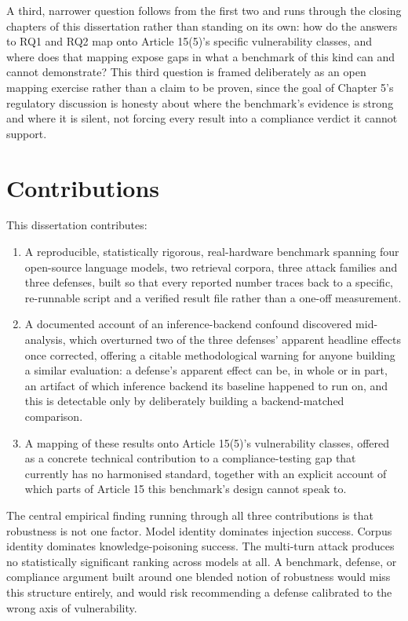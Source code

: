 A third, narrower question follows from the first two and runs through
the closing chapters of this dissertation rather than standing on its
own: how do the answers to RQ1 and RQ2 map onto Article 15(5)'s specific
vulnerability classes, and where does that mapping expose gaps in what a
benchmark of this kind can and cannot demonstrate? This third question
is framed deliberately as an open mapping exercise rather than a claim
to be proven, since the goal of Chapter 5's regulatory discussion is
honesty about where the benchmark's evidence is strong and where it is
silent, not forcing every result into a compliance verdict it cannot
support.

\clearpage
\section{Contributions}

This dissertation contributes:

\begin{enumerate}
    \item A reproducible, statistically rigorous, real-hardware
    benchmark spanning four open-source language models, two retrieval
    corpora, three attack families and three defenses, built so that
    every reported number traces back to a specific, re-runnable script
    and a verified result file rather than a one-off measurement.
    \item A documented account of an inference-backend confound
    discovered mid-analysis, which overturned two of the three defenses'
    apparent headline effects once corrected, offering a citable
    methodological warning for anyone building a similar evaluation: a
    defense's apparent effect can be, in whole or in part, an artifact
    of which inference backend its baseline happened to run on, and this
    is detectable only by deliberately building a backend-matched
    comparison.
    \item A mapping of these results onto Article 15(5)'s vulnerability
    classes, offered as a concrete technical contribution to a
    compliance-testing gap that currently has no harmonised standard,
    together with an explicit account of which parts of Article 15 this
    benchmark's design cannot speak to.
\end{enumerate}

The central empirical finding running through all three contributions is
that robustness is not one factor. Model identity dominates injection
success. Corpus identity dominates knowledge-poisoning success. The
multi-turn attack produces no statistically significant ranking across
models at all. A benchmark, defense, or compliance argument built around
one blended notion of robustness would miss this structure entirely, and
would risk recommending a defense calibrated to the wrong axis of
vulnerability.

